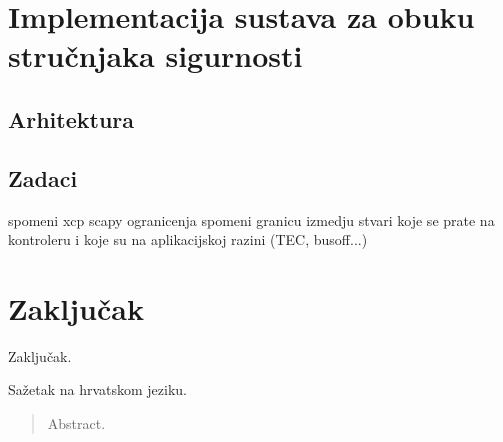 \documentclass[times, utf8, diplomski, numeric]{fer}
\begin{document}
\chapter{Implementacija sustava za obuku stručnjaka sigurnosti}

\section{Arhitektura}
\section{Zadaci}
spomeni xcp scapy ogranicenja
spomeni granicu izmedju stvari koje se prate na kontroleru i koje su na aplikacijskoj razini (TEC, busoff...)
\chapter{Zaključak}
 Zaključak.






\begin{sazetak}
Sažetak na hrvatskom jeziku.

\end{sazetak}

\begin{abstract}
Abstract.

\end{abstract}
\end{document}
